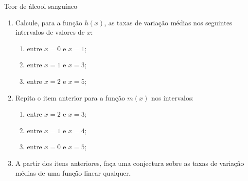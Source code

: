 \begin{task}{Teor de álcool sanguíneo}
\begin{enumerate}
\item {} 
Calcule, para a função \(h(x)\), as taxas de variação médias nos seguintes intervalos de valores de \(x\):

\begin{enumerate}
\item entre \(x=0\) e \(x=1\);

\item entre \(x=1\) e \(x=3\);

\item entre \(x=2\) e \(x=5\);
\end{enumerate}

\item {} 
Repita o item anterior para a função \(m(x)\) nos intervalos:

\begin{enumerate}
\item entre \(x=2\) e \(x=3\);

\item entre \(x=1\) e \(x=4\);

\item entre \(x=0\) e \(x=5\);
\end{enumerate}

\item {} 
A partir dos itens anteriores, faça uma conjectura sobre as taxas de variação médias de uma função linear qualquer.

\end{enumerate}
\end{task}

